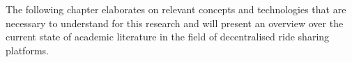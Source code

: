 The following chapter elaborates on relevant concepts and technologies that are necessary to understand for this research and will present an overview over the current state of academic literature in the field of decentralised ride sharing platforms. 